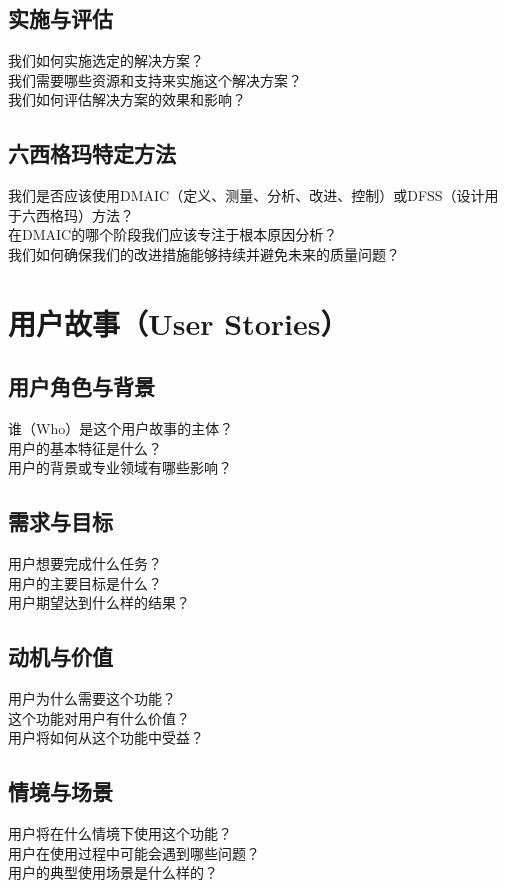 \documentclass[12pt]{book}
\begin{document}
\subsection{实施与评估}
我们如何实施选定的解决方案？\\
我们需要哪些资源和支持来实施这个解决方案？\\
我们如何评估解决方案的效果和影响？\\

\subsection{六西格玛特定方法}
我们是否应该使用DMAIC（定义、测量、分析、改进、控制）或DFSS（设计用于六西格玛）方法？\\
在DMAIC的哪个阶段我们应该专注于根本原因分析？\\
我们如何确保我们的改进措施能够持续并避免未来的质量问题？\\


\section{用户故事（User Stories）}
\subsection{用户角色与背景}
谁（Who）是这个用户故事的主体？\\
用户的基本特征是什么？\\
用户的背景或专业领域有哪些影响？\\

\subsection{需求与目标}
用户想要完成什么任务？\\
用户的主要目标是什么？\\
用户期望达到什么样的结果？\\

\subsection{动机与价值}
用户为什么需要这个功能？\\
这个功能对用户有什么价值？\\
用户将如何从这个功能中受益？\\

\subsection{情境与场景}
用户将在什么情境下使用这个功能？\\
用户在使用过程中可能会遇到哪些问题？\\
用户的典型使用场景是什么样的？\\
\end{document}
